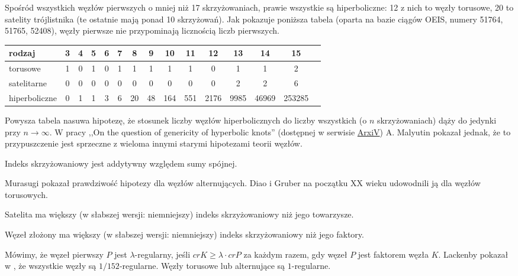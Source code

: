 Spośród wszystkich węzłów pierwszych o mniej niż 17 skrzyżowaniach, prawie wszystkie są hiperboliczne: 12 z nich to węzły torusowe, 20 to satelity trójlistnika (te ostatnie mają ponad 10 skrzyżowań).
Jak pokazuje poniższa tabela (oparta na bazie ciągów OEIS, numery 51764, 51765, 52408), węzły pierwsze nie przypominają licznością liczb pierwszych.

\renewcommand*{\arraystretch}{1.4}
\footnotesize
\begin{longtable}{lcccccccccccccc}
\hline
    \textbf{rodzaj} & 3 & 4 & 5 & 6 & 7 & 8  & 9  & 10  & 11  & 12   & 13   & 14    & 15     \\ \hline \endhead
    torusowe        & 1 & 0 & 1 & 0 & 1 & 1  & 1  & 1   & 1   & 0    & 1    & 1     & 2      \\
    satelitarne     & 0 & 0 & 0 & 0 & 0 & 0  & 0  & 0   & 0   & 0    & 2    & 2     & 6      \\
    hiperboliczne   & 0 & 1 & 1 & 3 & 6 & 20 & 48 & 164 & 551 & 2176 & 9985 & 46969 & 253285 \\
    \hline
\end{longtable}
\normalsize

Powysza tabela nasuwa hipotezę,
że stosunek liczby węzłów hiperbolicznych do liczby wszystkich
(o $n$ skrzyżowaniach) dąży do jedynki przy $n \to \infty$.
W pracy ,,On the question of genericity of hyperbolic knots'' (dostępnej w serwisie \href{https://arxiv.org/abs/1612.03368v1}{ArxiV}) A. Malyutin pokazał jednak, że to przypuszczenie jest sprzeczne z wieloma innymi starymi hipotezami teorii węzłów.

\begin{conjecture}
    Indeks skrzyżowaniowy jest addytywny względem sumy spójnej.
\end{conjecture}

Murasugi pokazał prawdziwość hipotezy dla węzłów alternujących.
Diao i Gruber na początku XX wieku udowodnili ją dla węzłów torusowych.

\begin{conjecture}
    Satelita ma większy
    (w słabszej wersji: niemniejszy)
    indeks skrzyżowaniowy niż jego towarzysze.
\end{conjecture}

\begin{conjecture}
    Węzeł złożony ma większy
    (w słabszej wersji: niemniejszy)
    indeks skrzyżowaniowy niż jego faktory.
\end{conjecture}

Mówimy, że węzeł pierwszy $P$ jest $\lambda$-regularny,
jeśli $cr K \ge \lambda \cdot cr P$ za każdym razem,
gdy węzeł $P$ jest faktorem węzła $K$.
Lackenby pokazał w \cite{lackenby09}, że wszystkie węzły są $1/152$-regularne.
Węzły torusowe lub alternujące są $1$-regularne.

